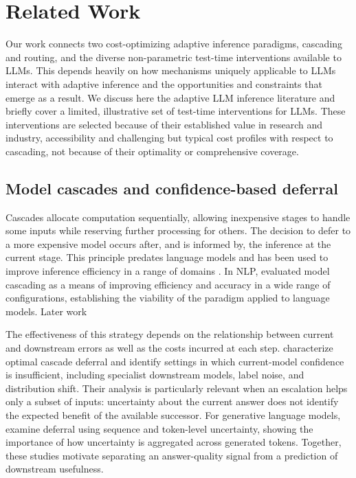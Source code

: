 \documentclass[sigconf]{acmart}
\begin{document}
\section{Related Work}
\label{sec:related-work}

Our work connects two cost-optimizing adaptive inference paradigms, cascading and routing, and the diverse non-parametric test-time interventions available to LLMs. This depends heavily on how mechanisms uniquely applicable to LLMs interact with adaptive inference and the opportunities and constraints that emerge as a result. We discuss here the adaptive LLM inference literature and briefly cover a limited, illustrative set of test-time interventions for LLMs. These interventions are selected because of their established value in research and industry, accessibility and challenging but typical cost profiles with respect to cascading, not because of their optimality or comprehensive coverage.

\subsection{Model cascades and confidence-based deferral}

Cascades allocate computation sequentially, allowing inexpensive stages to handle some inputs while reserving further processing for others. The decision to defer to a more expensive model occurs after, and is informed by, the inference at the current stage. This principle predates language models and has been used to improve inference efficiency in a range of domains \citet{viola, todo}. In NLP, \citet{varshney-baral-2022-model} evaluated model cascading as a means of improving efficiency and accuracy in a wide range of configurations, establishing the viability of the paradigm applied to language models. Later work


The effectiveness of this strategy depends on the relationship between current and downstream errors as well as the costs incurred at each step. \citet{jitkrittum} characterize optimal cascade deferral and identify settings in which current-model confidence is insufficient, including specialist downstream models, label noise, and distribution shift. Their analysis is particularly relevant when an escalation helps only a subset of inputs: uncertainty about the current answer does not identify the expected benefit of the available successor. For generative language models, \citet{Gupta2024} examine deferral using sequence and token-level uncertainty, showing the importance of how uncertainty is aggregated across generated tokens. Together, these studies motivate separating an answer-quality signal from a prediction of downstream usefulness.
\end{document}
